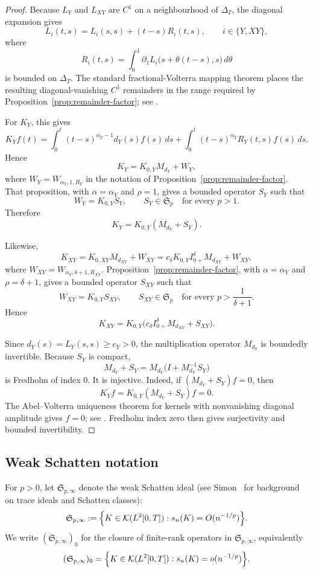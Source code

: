 \documentclass[11pt,a4paper]{amsart}
\theoremstyle{plain}
\theoremstyle{definition}
\theoremstyle{remark}
\begin{document}
\begin{proof}
Because $L_Y$ and $L_{XY}$ are $C^1$ on a neighbourhood of $\Delta_T$, the diagonal expansion gives
\[
L_i(t,s)=L_i(s,s)+(t-s)R_i(t,s),\qquad i\in\{Y,XY\},
\]
where
\[
R_i(t,s)=\int_0^1 \partial_1L_i\bigl(s+\theta(t-s),s\bigr)\,d\theta
\]
is bounded on $\Delta_T$.  The standard fractional-Volterra mapping theorem places the resulting
diagonal-vanishing $C^1$ remainders in the range required by Proposition~\ref{prop:remainder-factor}; see \cite[Chs.~2--3]{SKM93}.

For $K_Y$, this gives
\[
K_Yf(t)
=
\int_0^t (t-s)^{\alpha_Y-1}d_Y(s)f(s)\,ds
+
\int_0^t (t-s)^{\alpha_Y}R_Y(t,s)f(s)\,ds.
\]
Hence
\[
K_Y=K_{0,Y}M_{d_Y}+W_Y,
\]
where $W_Y=W_{\alpha_Y,1,R_Y}$ in the notation of Proposition~\ref{prop:remainder-factor}. That proposition, with $\alpha=\alpha_Y$ and $\rho=1$, gives a bounded operator $S_Y$ such that
\[
W_Y=K_{0,Y}S_Y,
\qquad
S_Y\in\mathfrak S_p\quad\text{for every }p>1.
\]
Therefore
\[
K_Y=K_{0,Y}(M_{d_Y}+S_Y).
\]

Likewise,
\[
K_{XY}=K_{0,XY}M_{d_{XY}}+W_{XY}
= c_\delta K_{0,Y}I_{0+}^{\delta}M_{d_{XY}}+W_{XY},
\]
where $W_{XY}=W_{\alpha_Y,\delta+1,R_{XY}}$. Proposition~\ref{prop:remainder-factor}, with $\alpha=\alpha_Y$ and $\rho=\delta+1$, gives a bounded operator $S_{XY}$ such that
\[
W_{XY}=K_{0,Y}S_{XY},
\qquad
S_{XY}\in\mathfrak S_p\quad\text{for every }p>\frac{1}{\delta+1}.
\]
Hence
\[
K_{XY}=K_{0,Y}\bigl(c_\delta I_{0+}^{\delta}M_{d_{XY}}+S_{XY}\bigr).
\]

Since $d_Y(s)=L_Y(s,s)\ge c_Y>0$, the multiplication operator $M_{d_Y}$ is boundedly invertible.
Because $S_Y$ is compact,
\[
M_{d_Y}+S_Y=M_{d_Y}\bigl(I+M_{d_Y}^{-1}S_Y\bigr)
\]
is Fredholm of index $0$. It is injective. Indeed, if $(M_{d_Y}+S_Y)f=0$, then
\[
K_Yf=K_{0,Y}(M_{d_Y}+S_Y)f=0.
\]
The Abel--Volterra uniqueness theorem for kernels with nonvanishing diagonal amplitude gives
$f=0$; see \cite[Chs.~2--3]{SKM93}. Fredholm index zero then gives surjectivity and bounded
invertibility.
\end{proof}

\subsection{Weak Schatten notation}

For $p>0$, let $\mathfrak S_{p,\infty}$ denote the weak Schatten ideal (see Simon~\cite{Sim05} for background on trace ideals and Schatten classes):
\[
\mathfrak S_{p,\infty}
:=
\Bigl\{K\in\mathcal K(L^2[0,T]) : s_n(K)=O(n^{-1/p})\Bigr\}.
\]
We write $(\mathfrak S_{p,\infty})_0$ for the closure of finite-rank operators in $\mathfrak S_{p,\infty}$, equivalently
\[
(\mathfrak S_{p,\infty})_0
=
\Bigl\{K\in\mathcal K(L^2[0,T]) : s_n(K)=o(n^{-1/p})\Bigr\}.
\]
\end{document}
